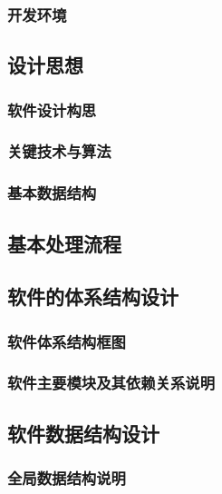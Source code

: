\documentclass[UTF8,a4paper,12pt]{ctexart}
\newcommand{\blankline}{\par\vspace{1.2em}}
\begin{document}
\subsubsection{开发环境}
\blankline

\subsection{设计思想}

\subsubsection{软件设计构思}
\blankline

\subsubsection{关键技术与算法}
\blankline

\subsubsection{基本数据结构}
\blankline

\subsection{基本处理流程}
\blankline

\subsection{软件的体系结构设计}

\subsubsection{软件体系结构框图}
\blankline

\subsubsection{软件主要模块及其依赖关系说明}
\blankline

\subsection{软件数据结构设计}

\subsubsection{全局数据结构说明}
\blankline
\end{document}
